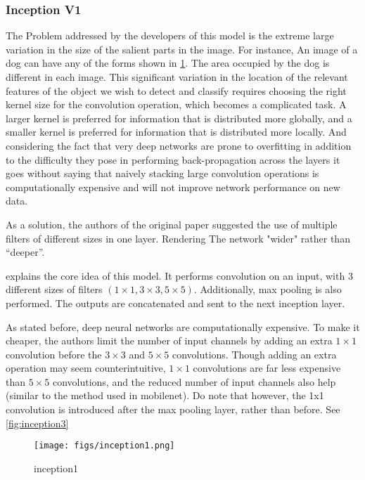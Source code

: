 \subsubsection{Inception V1}
The Problem addressed by the developers of this model is the extreme large variation in the size of the salient parts in the image. For instance, An image of a dog can have any of the forms shown in \cref{fig:inception1}. The area occupied by the dog is different in each image. This significant variation in the location of the relevant features of the object we wish to detect and classify requires choosing the right kernel size for the convolution operation, which becomes a complicated task. A larger kernel is preferred for information that is distributed more globally, and a smaller kernel is preferred for information that is distributed more locally. And considering the fact that very deep networks are prone to overfitting in addition to the difficulty they pose in performing back-propagation across the layers it goes without saying that naively stacking large convolution operations is computationally expensive and will not improve network performance on new data.

As a solution, the authors of the original paper suggested the use of multiple filters of different sizes in one layer. Rendering The network "wider" rather than “deeper”.

 explains the core idea of this model. It performs convolution on an input, with 3 different sizes of filters $(1 \times 1, 3 \times 3, 5 \times 5)$. Additionally, max pooling is also performed. The outputs are concatenated and sent to the next inception layer.

As stated before, deep neural networks are computationally expensive. To make it cheaper, the authors limit the number of input channels by adding an extra $1 \times 1$ convolution before the $3 \times 3$ and $5 \times 5$ convolutions. Though adding an extra operation may seem counterintuitive, $1 \times 1$ convolutions are far less expensive than $5 \times 5$ convolutions, and the reduced number of input channels also help (similar to the method used in mobilenet). Do note that however, the 1x1 convolution is introduced after the max pooling layer, rather than before. See \cref{fig:inception3}


\begin{figure}[ht]
	\centering
	\texttt{[image: figs/inception1.png]}
	\caption{inception1}\label{fig:inception1}
\end{figure}

